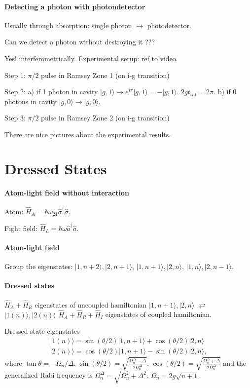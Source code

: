 \documentclass[../../note.tex]{subfiles}
\begin{document}
\paragraph*{Detecting a photon with photondetector}
Usually through absorption: single photon $\rightarrow$ photodetector.

Can we detect a photon without destroying it ???

Yes! interferometrically. Experimental setup: ref to video.

Step 1: $\pi/2$ pulse in Ramsey Zone 1 (on i-g transition)

Step 2: a) if 1 photon in cavity $\vert g, 1 \rangle \rightarrow e^{i \pi} \vert g, 1 \rangle = - \vert g, 1\rangle$. $2 g t_{int} = 2 \pi$. b) if 0 photons in cavity $\vert g, 0 \rangle \rightarrow \vert g, 0 \rangle$.

Step 3: $\pi/2$ pulse in Ramsey Zone 2 (on i-g transition)

There are nice pictures about the experimental results.

\section{Dressed States}
\paragraph*{Atom-light field without interaction}
Atom: $\hat{H}_A = \hbar \omega_{21} \hat{\sigma}^{\dagger} \hat{\sigma}$.

Fight field: $\hat{H}_L = \hbar \omega \hat{a}^{\dagger} \hat{a}$.

\paragraph{Atom-light field}
Group the eigenstates: $\vert 1, n+2 \rangle, \vert 2, n+1 \rangle$, $\vert 1, n+1 \rangle, \vert 2, n \rangle$, $\vert 1, n \rangle, \vert 2, n-1 \rangle$.

\paragraph*{Dressed states}
$\hat{H}_A + \hat{H}_R$ eigenstates of uncoupled hamiltonian $\vert 1, n+1 \rangle, \vert 2, n \rangle$ $\rightleftarrows$ $\vert 1(n) \rangle, \vert 2(n) \rangle$ $\hat{H}_A + \hat{H}_R + \hat{H}_I$ eigenstates of coupled hamiltonian.

Dressed state eigenstates
\begin{align}
    \vert 1(n) \rangle = \sin(\theta/2) \vert 1, n+1 \rangle + \cos(\theta/2) \vert 2, n \rangle \\
    \vert 2(n) \rangle = \cos(\theta/2) \vert 1, n+1 \rangle - \sin(\theta/2) \vert 2, n \rangle,
\end{align}
where $\tan \theta = -\Omega_n/\Delta$, $\sin(\theta/2) = \sqrt{\frac{\Omega_n^{\Delta} - \Delta}{2 \Omega_n^{\Delta}}}$, $\cos(\theta/2) = \sqrt{\frac{\Omega_n^{\Delta} + \Delta}{2 \Omega_n^{\Delta}}}$ and the generalized Rabi frequency is $\Omega_{n}^{\Delta} = \sqrt{\Omega_n^2 + \Delta^2}$, $\Omega_n = 2g \sqrt{n+1}$.
\end{document}
